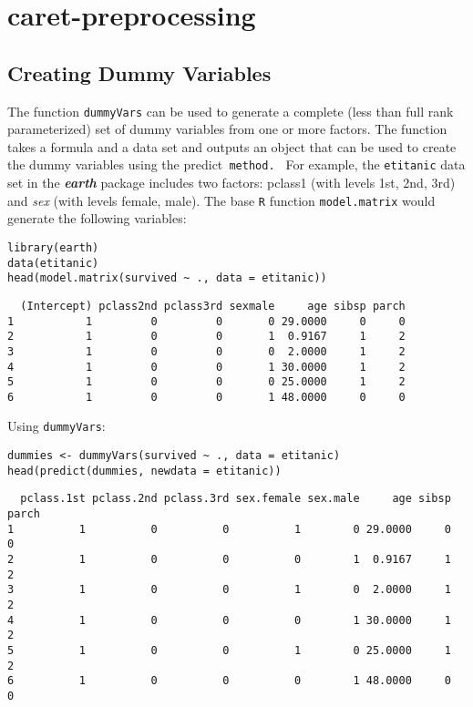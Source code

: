 \documentclass[caret-main.tex]{subfiles}
\begin{document}
\section{caret-preprocessing}


\subsection{Creating Dummy Variables}

The function \texttt{dummyVars} can be used to generate a complete (less than full rank parameterized) set of dummy variables from one or more factors. The function takes a formula and a data set and outputs an object that can be used to create the dummy variables using the predict\texttt{ method.
}
\noindent For example, the \texttt{etitanic} data set in the \textbf{\textit{earth}} package includes two factors: pclass1 (with levels 1st, 2nd, 3rd) and \textit{sex} (with levels female, male). The base \texttt{R} function \texttt{model.matrix} would generate the following variables:
\begin{framed}
\begin{verbatim}
library(earth)
data(etitanic)
head(model.matrix(survived ~ ., data = etitanic))
\end{verbatim}
\end{framed}

\begin{verbatim}
  (Intercept) pclass2nd pclass3rd sexmale     age sibsp parch
1           1         0         0       0 29.0000     0     0
2           1         0         0       1  0.9167     1     2
3           1         0         0       0  2.0000     1     2
4           1         0         0       1 30.0000     1     2
5           1         0         0       0 25.0000     1     2
6           1         0         0       1 48.0000     0     0
\end{verbatim}
\newpage
\noindent Using \texttt{dummyVars}:
\begin{framed}
\begin{verbatim}
dummies <- dummyVars(survived ~ ., data = etitanic)
head(predict(dummies, newdata = etitanic))
\end{verbatim}
\end{framed}
\begin{verbatim}
  pclass.1st pclass.2nd pclass.3rd sex.female sex.male     age sibsp parch
1          1          0          0          1        0 29.0000     0     0
2          1          0          0          0        1  0.9167     1     2
3          1          0          0          1        0  2.0000     1     2
4          1          0          0          0        1 30.0000     1     2
5          1          0          0          1        0 25.0000     1     2
6          1          0          0          0        1 48.0000     0     0
\end{verbatim}
\end{document}
